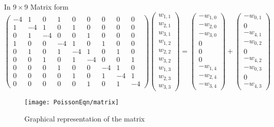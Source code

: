 In $9\times 9$ Matrix form
\[\left(\begin{array}{ccccccccc}
-4& 1 & 0 &1 &0 &0 &0 &0 &0\\
1&-4& 1 & 0 &1 &0 &0 &0 &0 \\
0 &1&-4&  0&0 &1 &0 &0 &0 \\
1 &0 &0 &-4& 1 & 0 &1 &0 &0\\
0 & 1 &0 &1&-4& 1 &0 &1 &0  \\
0 &0 &1 &0 &1&-4&0&  0 &1  \\
0&0&0&1 &0 &0 &-4& 1 & 0\\
0&0&0&0 & 1 &0 &1&-4& 1   \\
0&0&0&0 &0 &1 &0 &1&-4
\end{array}\right)
\left(\begin{array}{c}
w_{1,1}\\
w_{2,1}\\
w_{3,1}\\
w_{1,2}\\
w_{2,2}\\
w_{3,2}\\
w_{1,3}\\
w_{2,3}\\
w_{3,3}
\end{array}\right)=
\left(\begin{array}{c}
-w_{1,0}\\
-w_{2,0}\\
-w_{3,0}\\
0\\
0\\
0\\
-w_{1,4}\\
-w_{2,4}\\
-w_{3,4}
\end{array}\right)
+\left(\begin{array}{c}
-w_{0,1}\\
0\\
-w_{4,1}\\
-w_{0,2}\\
0\\
-w_{4,2}\\
-w_{0,3}\\
0\\
-w_{4,3}
\end{array}\right)
\]	
\begin{figure}[H]
  \caption{Graphical representation of the matrix}
  \centering
    \texttt{[image: PoissonEqn/matrix]}
\end{figure}


